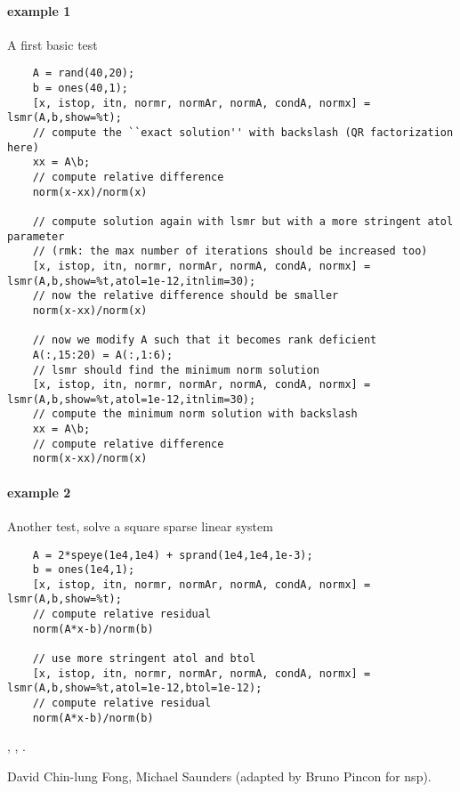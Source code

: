 \begin{examples}
  \paragraph{example 1} A first basic test
  \begin{Verbatim}
    A = rand(40,20);
    b = ones(40,1);
    [x, istop, itn, normr, normAr, normA, condA, normx] = lsmr(A,b,show=%t);
    // compute the ``exact solution'' with backslash (QR factorization here)
    xx = A\b;
    // compute relative difference 
    norm(x-xx)/norm(x)
    
    // compute solution again with lsmr but with a more stringent atol parameter
    // (rmk: the max number of iterations should be increased too)
    [x, istop, itn, normr, normAr, normA, condA, normx] = lsmr(A,b,show=%t,atol=1e-12,itnlim=30);
    // now the relative difference should be smaller
    norm(x-xx)/norm(x)
    
    // now we modify A such that it becomes rank deficient
    A(:,15:20) = A(:,1:6);
    // lsmr should find the minimum norm solution
    [x, istop, itn, normr, normAr, normA, condA, normx] = lsmr(A,b,show=%t,atol=1e-12,itnlim=30);
    // compute the minimum norm solution with backslash
    xx = A\b;
    // compute relative difference
    norm(x-xx)/norm(x)
  \end{Verbatim}
  
  \paragraph{example 2} Another test, solve a square sparse linear system
  \begin{Verbatim}
    A = 2*speye(1e4,1e4) + sprand(1e4,1e4,1e-3);
    b = ones(1e4,1);
    [x, istop, itn, normr, normAr, normA, condA, normx] = lsmr(A,b,show=%t);
    // compute relative residual
    norm(A*x-b)/norm(b)
    
    // use more stringent atol and btol
    [x, istop, itn, normr, normAr, normA, condA, normx] = lsmr(A,b,show=%t,atol=1e-12,btol=1e-12);
    // compute relative residual
    norm(A*x-b)/norm(b)
\end{Verbatim}

\end{examples}

\begin{manseealso}
  , , .
\end{manseealso}

\begin{authors}
  David Chin-lung Fong, Michael Saunders (adapted by Bruno Pincon for nsp).
\end{authors}
